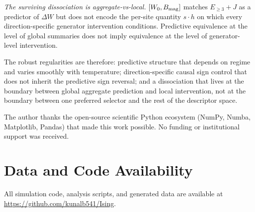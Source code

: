 \documentclass[aps,pre,preprint,superscriptaddress,showpacs]{revtex4-2}
\begin{document}
\emph{The surviving dissociation is aggregate-vs-local.}
$[W_0, B_{\rm mag}]$ matches $E_{\geq 3}+J$ as a predictor of
$\Delta W$ but does not encode the per-site quantity $s\cdot h$ on
which every direction-specific generator intervention conditions.
Predictive equivalence at the level of global summaries does not
imply equivalence at the level of generator-level intervention.

The robust regularities are therefore: predictive structure that
depends on regime and varies smoothly with temperature;
direction-specific causal sign control that does not inherit the
predictive sign reversal; and a dissociation that lives at the
boundary between global aggregate prediction and local intervention,
not at the boundary between one preferred selector and the rest of
the descriptor space.

\begin{acknowledgments}
The author thanks the open-source scientific Python ecosystem (NumPy, Numba,
Matplotlib, Pandas) that made this work possible.
No funding or institutional support was received.
\end{acknowledgments}

\section*{Data and Code Availability}

All simulation code, analysis scripts, and generated data are available at
\url{https://github.com/kunalb541/Ising}.
\end{document}
